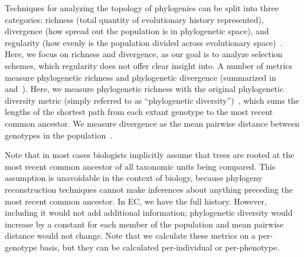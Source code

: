 Techniques for analyzing the topology of phylogenies can be split into three categories: richness (total quantity of evolutionary history represented), divergence (how spread out the population is in phylogenetic space), and regularity (how evenly is the population divided across evolutionary space)~\cite{tucker_guide_2017}. Here, we focus on richness and divergence, as our goal is to analyze selection schemes, which regularity does not offer clear insight into. %
A number of metrics measure phylogenetic richness and phylogenetic divergence (summarized in~\cite{winter_phylogenetic_2013} and~\cite{tucker_guide_2017}). Here, we measure phylogenetic richness with the original phylogenetic diversity metric (simply referred to as ``phylogenetic diversity'')~\cite{faith_conservation_1992}, which sums the lengths of the shortest path from each extant genotype to the most recent common ancestor.
We measure divergence as the mean pairwise distance between genotypes in the population~\cite{webb_exploring_2000}.  

Note that in most cases biologists implicitly assume that trees are rooted at the most recent common ancestor of all taxonomic units being compared. This assumption is unavoidable in the context of biology, because phylogeny reconstruction techniques cannot make inferences about anything preceding the most recent common ancestor. In EC, we have the full history. However, including it would not add additional information; phylogenetic diversity would increase by a constant for each member of the population and mean pairwise distance would not change. Note that we calculate these metrics on a per-genotype basis, 
but they can be calculated per-individual or per-phenotype.

